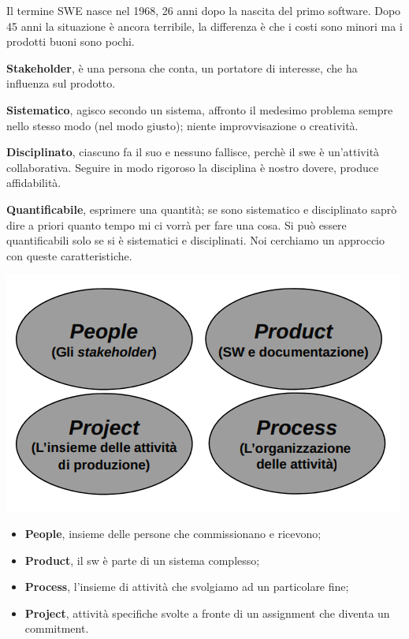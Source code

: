 Il termine SWE nasce nel 1968, 26 anni dopo la nascita del primo software. Dopo 45 anni la situazione è ancora terribile, la differenza è che i costi sono minori ma i prodotti buoni sono pochi.

\textbf{Stakeholder}, è una persona che conta, un portatore di interesse, che ha influenza sul prodotto.


\textbf{Sistematico}, agisco secondo un sistema, affronto il medesimo problema sempre nello stesso modo (nel modo giusto); niente improvvisazione o creatività.

\textbf{Disciplinato}, ciascuno fa il suo e nessuno fallisce, perchè il swe è un'attività collaborativa. Seguire in modo rigoroso la disciplina è nostro dovere, produce affidabilità.

\textbf{Quantificabile}, esprimere una quantità; se sono sistematico e disciplinato saprò dire a priori quanto tempo mi ci vorrà per fare una cosa. Si può essere quantificabili solo se si è sistematici e disciplinati. Noi cerchiamo un approccio con queste caratteristiche.

\begin{center}

\includegraphics[width=0.75\columnwidth]{img1} %

\end{center}

\begin{itemize}

	\item \textbf{People}, insieme delle persone che commissionano e ricevono;

	\item \textbf{Product}, il sw è parte di un sistema complesso;

	\item \textbf{Process}, l'insieme di attività che svolgiamo ad un particolare fine;

	\item \textbf{Project}, attività specifiche svolte a fronte di un assignment che diventa un commitment.

\end{itemize}

